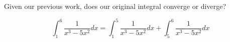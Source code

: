 \documentclass{ximera}
\begin{document}
\begin{exercise}
\begin{exercise}
\begin{exercise}
\begin{exercise}

Given our previous work, does our original integral converge or diverge?


\[
\int _{1}^{6} \frac{1}{x^3-5x^2} dx=\int_{1}^{5} \frac{1}{x^3-5x^2} dx + \int_{5}^{6} \frac{1}{x^3-5x^2} dx
\]

\begin{multipleChoice}
\end{multipleChoice}


\end{exercise}


\end{exercise}
\end{exercise}
\end{exercise}
\end{document}
